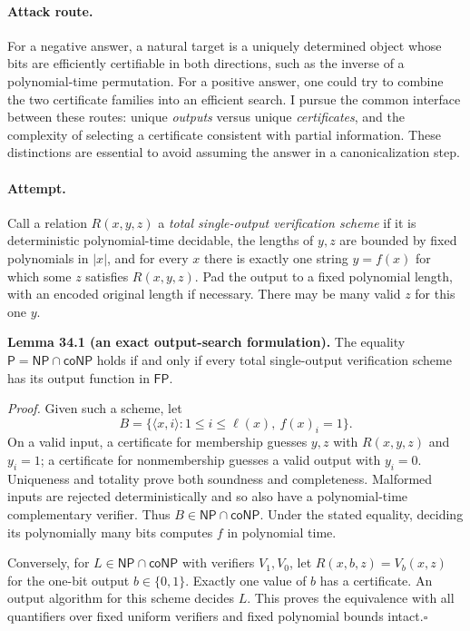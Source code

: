 \documentclass[11pt,a4paper]{article}
\numberwithin{equation}{section}
\begin{document}
\paragraph{Attack route.}
For a negative answer, a natural target is a uniquely determined object whose
bits are efficiently certifiable in both directions, such as the inverse of
a polynomial-time permutation. For a positive answer, one could try to
combine the two certificate families into an efficient search. I pursue the
common interface between these routes: unique \emph{outputs} versus unique
\emph{certificates}, and the complexity of selecting a certificate consistent
with partial information. These distinctions are essential to avoid assuming
the answer in a canonicalization step.

\paragraph{Attempt.}
Call a relation $R(x,y,z)$ a \emph{total single-output verification scheme}
if it is deterministic polynomial-time decidable, the lengths of $y,z$ are
bounded by fixed polynomials in $|x|$, and for every $x$ there is exactly one
string $y=f(x)$ for which some $z$ satisfies $R(x,y,z)$. Pad the output to a
fixed polynomial length, with an encoded original length if necessary.
There may be many valid $z$ for this one $y$.

\textbf{Lemma 34.1 (an exact output-search formulation).}
The equality $\mathsf P=\mathsf{NP}\cap\mathsf{coNP}$ holds if and only if
every total single-output verification scheme has its output function in
$\mathsf{FP}$.

\emph{Proof.} Given such a scheme, let
\[
 B=\{\langle x,i\rangle:1\le i\le\ell(x),\ f(x)_i=1\}.
\]
On a valid input, a certificate for membership guesses $y,z$ with
$R(x,y,z)$ and $y_i=1$; a certificate for nonmembership guesses a valid
output with $y_i=0$. Uniqueness and totality prove both soundness and
completeness. Malformed inputs are rejected deterministically and so also
have a polynomial-time complementary verifier. Thus
$B\in\mathsf{NP}\cap\mathsf{coNP}$. Under the stated equality, deciding
its polynomially many bits computes $f$ in polynomial time.

Conversely, for $L\in\mathsf{NP}\cap\mathsf{coNP}$ with verifiers $V_1,V_0$,
let $R(x,b,z)=V_b(x,z)$ for the one-bit output $b\in\{0,1\}$. Exactly one
value of $b$ has a certificate. An output algorithm for this scheme decides
$L$. This proves the equivalence with all quantifiers over fixed uniform
verifiers and fixed polynomial bounds intact.\hfill$\square$
\end{document}

